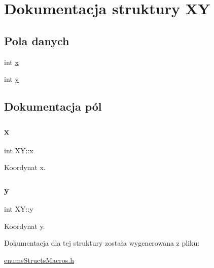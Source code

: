 \hypertarget{struct_x_y}{}\section{Dokumentacja struktury XY}
\label{struct_x_y}
\subsection*{Pola danych}
\begin{DoxyCompactItemize}
\item 
int \mbox{\hyperlink{struct_x_y_a29c62a4354023af09e8457601e41d229}{x}}
\item 
int \mbox{\hyperlink{struct_x_y_a5260fedc448051582dbf7f4cbd2d3dfe}{y}}
\end{DoxyCompactItemize}


\subsection{Dokumentacja pól}
\mbox{\label{struct_x_y_a29c62a4354023af09e8457601e41d229}} 
\subsubsection{\texorpdfstring{x}{x}}
{\footnotesize\ttfamily int X\+Y\+::x}

Koordynat x. \mbox{\label{struct_x_y_a5260fedc448051582dbf7f4cbd2d3dfe}} 
\subsubsection{\texorpdfstring{y}{y}}
{\footnotesize\ttfamily int X\+Y\+::y}

Koordynat y. 

Dokumentacja dla tej struktury została wygenerowana z pliku\+:\begin{DoxyCompactItemize}
\item 
\mbox{\hyperlink{enums_structs_macros_8h}{enums\+Structs\+Macros.\+h}}\end{DoxyCompactItemize}

